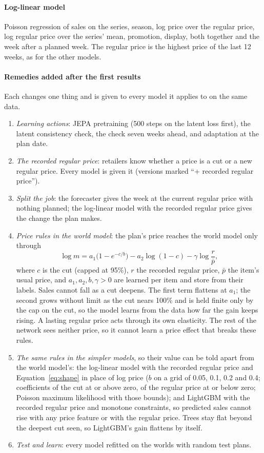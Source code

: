 \paragraph{Log-linear model} Poisson regression of sales on the series, season, log price over the regular price,
log regular price over the series' mean, promotion, display, both together and the week after a planned week. The
regular price is the highest price of the last 12 weeks, as for the other models.

\paragraph{Remedies added after the first results} Each changes one thing and is given to every model it applies
to on the same data.
\begin{enumerate}\setlength{\itemsep}{1pt}
\item \emph{Learning actions}: JEPA pretraining (500 steps on the latent loss first), the latent consistency check,
the check seven weeks ahead, and adaptation at the plan date.
\item \emph{The recorded regular price}: retailers know whether a price is a cut or a new regular price. Every
model is given it (versions marked ``+ recorded regular price'').
\item \emph{Split the job}: the forecaster gives the week at the current regular price with nothing planned; the
log-linear model with the recorded regular price gives the change the plan makes.
\item \emph{Price rules in the world model}: the plan's price reaches the world model only through
\begin{equation}\label{eq:shape}
\log m = a_1\bigl(1 - e^{-c/b}\bigr) - a_2 \log(1-c) - \gamma \log\frac{r}{\bar p},
\end{equation}
where $c$ is the cut (capped at 95\%), $r$ the recorded regular price, $\bar p$ the item's usual price, and
$a_1, a_2, b, \gamma > 0$ are learned per item and store from their labels. Sales cannot fall as a cut deepens. The
first term flattens at $a_1$; the second grows without limit as the cut nears 100\% and is held finite only by the
cap on the cut, so the model learns from the data how far the gain keeps rising. A lasting regular price acts
through its own elasticity. The rest of the network sees
neither price, so it cannot learn a price effect that breaks these rules.
\item \emph{The same rules in the simpler models}, so their value can be told apart from the world model's: the
log-linear model with the recorded regular price and Equation~\eqref{eq:shape} in place of log price ($b$ on a grid of
0.05, 0.1, 0.2 and 0.4; coefficients of the cut at or above zero, of the regular price at or below zero; Poisson
maximum likelihood with those bounds); and LightGBM with the recorded regular price and monotone constraints, so
predicted sales cannot rise with any price feature or with the regular price. Trees stay flat beyond the deepest cut
seen, so LightGBM's gain flattens by itself.
\item \emph{Test and learn}: every model refitted on the worlds with random test plans.
\end{enumerate}

